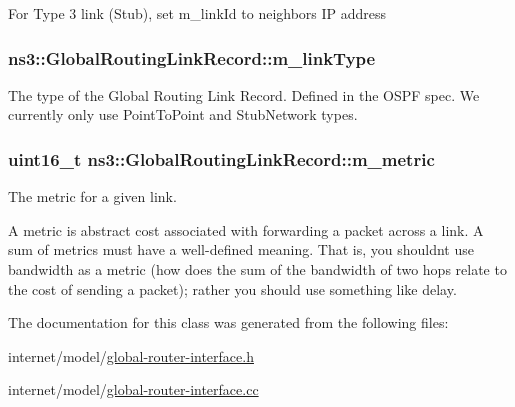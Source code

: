 For Type 3 link (Stub), set m\+\_\+link\+Id to neighbor\textquotesingle{}s IP address 
\subsubsection[{\texorpdfstring{m\+\_\+link\+Type}{m_linkType}}]{ ns3\+::\+Global\+Routing\+Link\+Record\+::m\+\_\+link\+Type\hspace{0.3cm}{\ttfamily [private]}}\hypertarget{classns3_1_1GlobalRoutingLinkRecord_a22747eea30dc16e473676af10eac3cfb}{}\label{classns3_1_1GlobalRoutingLinkRecord_a22747eea30dc16e473676af10eac3cfb}
The type of the Global Routing Link Record. Defined in the O\+S\+PF spec. We currently only use Point\+To\+Point and Stub\+Network types. 
\subsubsection[{\texorpdfstring{m\+\_\+metric}{m_metric}}]{\setlength{\rightskip}{0pt plus 5cm}uint16\+\_\+t ns3\+::\+Global\+Routing\+Link\+Record\+::m\+\_\+metric\hspace{0.3cm}{\ttfamily [private]}}\hypertarget{classns3_1_1GlobalRoutingLinkRecord_a9f50548fa7db2a1490d0855e0a541e68}{}\label{classns3_1_1GlobalRoutingLinkRecord_a9f50548fa7db2a1490d0855e0a541e68}
The metric for a given link.

A metric is abstract cost associated with forwarding a packet across a link. A sum of metrics must have a well-\/defined meaning. That is, you shouldn\textquotesingle{}t use bandwidth as a metric (how does the sum of the bandwidth of two hops relate to the cost of sending a packet); rather you should use something like delay. 

The documentation for this class was generated from the following files\+:\begin{DoxyCompactItemize}
\item 
internet/model/\hyperlink{global-router-interface_8h}{global-\/router-\/interface.\+h}\item 
internet/model/\hyperlink{global-router-interface_8cc}{global-\/router-\/interface.\+cc}\end{DoxyCompactItemize}
